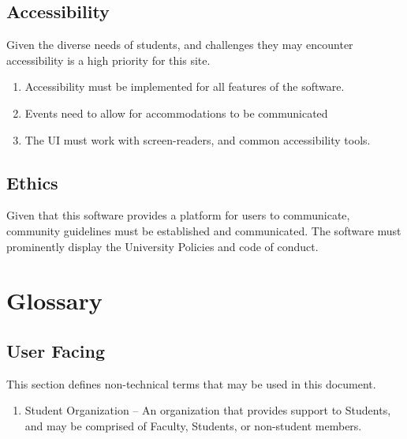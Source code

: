 	\subsection{Accessibility}
		Given the diverse needs of students, and challenges they may encounter accessibility is a high priority for this site.
		\begin{enumerate}[leftmargin=3\parindent]
			\item Accessibility must be implemented for all features of the software.
			\item Events need to allow for accommodations to be communicated
			\item The UI must work with screen-readers, and common accessibility tools.
		\end{enumerate}
	\subsection{Ethics}
		Given that this software provides a platform for users to communicate, community guidelines must be established and communicated.
		The software must prominently display the University Policies and code of conduct.


\newpage %
\section{Glossary}
	\subsection{User Facing}
	This section defines non-technical terms that may be used in this document.
	\begin{enumerate}[leftmargin=3\parindent]
		\item Student Organization -- An organization that provides support to Students, and may be comprised of Faculty, Students, or non-student members.
	\end{enumerate}

